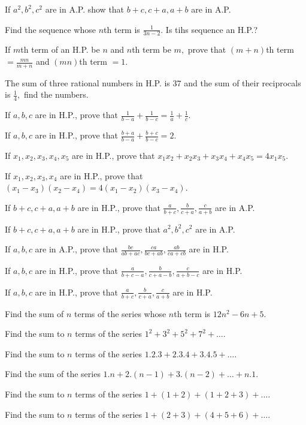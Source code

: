 \item If $a^2, b^2, c^2$ are in A.P. show that $b + c, c + a, a + b$ are in A.P.
\item Find the sequence whose $n$th term is $\frac{1}{3n - 2}.$ Is tihs sequence an H.P.?
\item If $m$th term of an H.P. be $n$ and $n$th term be $m,$ prove that $(m + n)$th term $= \frac{mn}{m + n}$ and $(mn)$th term $=
  1$.
\item The sum of three rational numbers in H.P. is $37$ and the sum of their reciprocals is $\frac{1}{4},$ find the numbers.
\item If $a, b, c$ are in H.P., prove that $\frac{1}{b - a} + \frac{1}{b - c} = \frac{1}{a} + \frac{1}{c}$.
\item If $a, b, c$ are in H.P., prove that $\frac{b + a}{b - a} + \frac{b + c}{b - c} = 2$.
\item If $x_1, x_2, x_3, x_4, x_5$ are in H.P., prove that $x_1x_2 + x_2x_3 + x_3x_4 + x_4x_5 = 4x_1x_5$.
\item If $x_1, x_2, x_3, x_4$ are in H.P., prove that $(x_1 - x_3)(x_2 - x_4) = 4(x_1 - x_2)(x_3 - x_4)$.
\item If $b + c, c + a, a + b$ are in H.P., prove that $\frac{a}{b + c}, \frac{b}{c + a}, \frac{c}{a + b}$ are in A.P.
\item If $b + c, c + a, a + b$ are in H.P., prove that $a^2, b^2, c^2$ are in A.P.
\item If $a, b, c$ are in A.P., prove that $\frac{bc}{ab + ac}, \frac{ca}{bc + ab}, \frac{ab}{ca + cb}$ are in H.P.
\item If $a, b, c$ are in H.P., prove that $\frac{a}{b + c - a}, \frac{b}{c + a - b}, \frac{c}{a + b - c}$ are in H.P.
\item If $a, b, c$ are in H.P., prove that $\frac{a}{b + c}, \frac{b}{c + a}, \frac{c}{a + b}$ are in H.P.
\item Find the sum of $n$ terms of the series whose $n$th term is $12n^2 - 6n + 5$.
\item Find the sum to $n$ terms of the series $1^2 + 3^2 + 5^2 + 7^2 + \ldots$.
\item Find the sum to $n$ terms of the series $1.2.3 + 2.3.4 + 3.4.5 + \ldots$.
\item Find the sum of the series $1.n + 2.(n - 1) + 3.(n - 2) + \ldots + n.1$.
\item Find the sum to $n$ terms of the series $1 + (1 + 2) + (1 + 2 + 3) + \ldots$.
\item Find the sum to $n$ terms of the series $1 + (2 + 3) + (4 + 5 + 6) + \ldots$.

